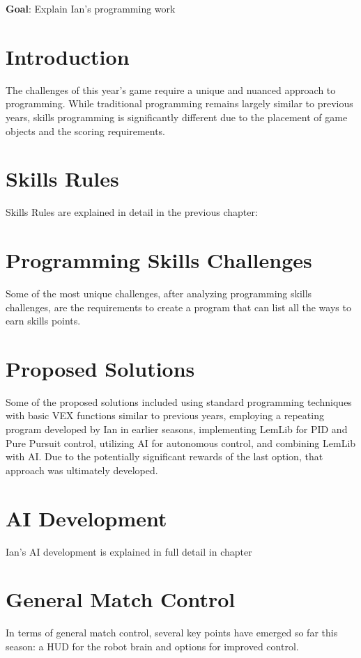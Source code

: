 \label{Programming}
\textbf{Goal}: Explain Ian's programming work

\section*{Introduction}
The challenges of this year's game require a unique and nuanced approach to programming. While traditional programming remains largely similar to previous years, skills programming is significantly different due to the placement of game objects and the scoring requirements.

\section*{Skills Rules}
Skills Rules are explained in detail in the previous chapter: 
\section*{Programming Skills Challenges}
Some of the most unique challenges, after analyzing programming skills challenges, are the requirements to create a program that can list all the ways to earn skills points.

\section*{Proposed Solutions}
Some of the proposed solutions included using standard programming techniques with basic VEX functions similar to previous years, employing a repeating program developed by Ian in earlier seasons, implementing LemLib for PID and Pure Pursuit control, utilizing AI for autonomous control, and combining LemLib with AI. Due to the potentially significant rewards of the last option, that approach was ultimately developed.

\section*{AI Development}
Ian's AI development is explained in full detail in chapter 

\section*{General Match Control}
In terms of general match control, several key points have emerged so far this season: a HUD for the robot brain and options for improved control.

